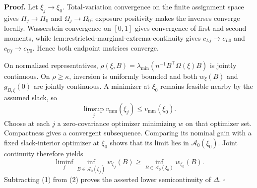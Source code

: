 \textbf{Proof.}
Let \(\xi_j\to\xi_0\).  Total-variation convergence on the finite assignment space gives \(\Pi_j\to\Pi_0\) and \(\Omega_j\to\Omega_0\); exposure positivity makes the inverses converge locally.  Wasserstein convergence on \([0,1]\) gives convergence of first and second moments, while lem:restricted-marginal-extrema-continuity gives \(c_{Lj}\to c_{L0}\) and \(c_{Uj}\to c_{U0}\).  Hence both endpoint matrices converge.

On normalized representatives, \(\rho(\xi,B)=\lambda_{\min}(n^{-1}B^\top\Omega(\xi)B)\) is jointly continuous.  On \(\rho\ge\kappa\), inversion is uniformly bounded and both \(w_\xi(B)\) and \(g_{B,\xi}(0)\) are jointly continuous.  A minimizer at \(\xi_0\) remains feasible nearby by the assumed slack, so
\[
\limsup_jv_{\mathrm{mm}}(\xi_j)\le v_{\mathrm{mm}}(\xi_0).
\tag{1}
\]
Choose at each \(j\) a zero-covariance optimizer minimizing \(w\) on that optimizer set.  Compactness gives a convergent subsequence.  Comparing its nominal gain with a fixed slack-interior optimizer at \(\xi_0\) shows that its limit lies in \(\mathcal A_0(\xi_0)\).  Joint continuity therefore yields
\[
\liminf_j\inf_{B\in\mathcal A_0(\xi_j)}w_{\xi_j}(B)
\ge\inf_{B\in\mathcal A_0(\xi_0)}w_{\xi_0}(B).
\tag{2}
\]
Subtracting (1) from (2) proves the asserted lower semicontinuity of \(\Delta\). \(\square\)
